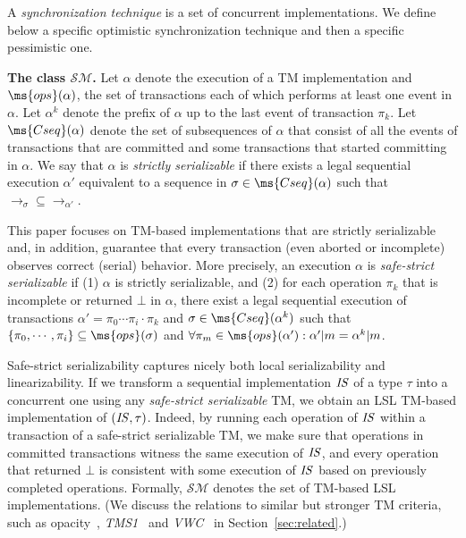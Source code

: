 \documentclass[11pt,pdftex,letterpaper]{article}
\newcommand{\id}[1]{\mbox{\textit{#1}}}\newcommand{\res}[1]{\mbox{\textbf{#1}}}
\begin{document}
A \emph{synchronization technique} is a set of concurrent implementations.
We define below a specific optimistic synchronization technique and then
a specific pessimistic one.


\vspace{1mm}\noindent\textbf{The class $\mathcal{SM}$.}
Let $\alpha$ denote the execution of a TM implementation and
$\ms{ops}(\alpha)$, 
the set of transactions each of which performs at least one event in $\alpha$.
Let ${\alpha}^k$ denote the prefix of $\alpha$ up to the last event of transaction $\pi_k$.
Let $\ms{Cseq}(\alpha)$ denote the set of subsequences of ${\alpha}$  that
consist of all the events of transactions that are committed and some
transactions that started committing in $\alpha$. 
We say that $\alpha$ is \emph{strictly serializable} if 
there exists a legal sequential execution $\alpha'$ equivalent to
a sequence in $\sigma\in\ms{Cseq}(\alpha)$
such that $\rightarrow_{\sigma} \subseteq \rightarrow_{\alpha'}$. 

This paper focuses on TM-based implementations that are strictly
serializable and, in addition, guarantee that every
transaction (even aborted or incomplete) observes correct (serial)
behavior.  
More precisely, an execution $\alpha$ is  \emph{safe-strict serializable} if
(1) $\alpha$ is strictly serializable, and
(2) for each operation $\pi_k$ that is incomplete or returned $\bot$ in
$\alpha$, there exist a legal sequential execution of transactions
$\alpha'=\pi_0\cdots \pi_i\cdot \pi_k$ and
$\sigma\in\ms{Cseq}(\alpha^k)$ such that $\{\pi_0,\cdots, \pi_i\}
\subseteq \ms{ops}(\sigma)$ and $\forall \pi_m\in \ms{ops}(\alpha'):{\alpha'}|m={\alpha^k}|m$.

Safe-strict serializability captures nicely both local serializability
and linearizability. 
If we transform a sequential implementation
$\id{IS}$ of a type $\tau$ into a concurrent one using any
\emph{safe-strict serializable} TM, 
we obtain an LSL TM-based
implementation of $(\id{IS},\tau)$. 
Indeed, by running each operation of $\id{IS}$ within a transaction of
a safe-strict serializable TM, we make sure that operations in 
committed transactions witness the same execution of $\id{IS}$, and
every operation that returned $\bot$ is consistent with some
execution of $\id{IS}$ based on previously completed operations.
Formally, $\mathcal{SM}$ denotes the set of TM-based LSL
implementations.
(We discuss the relations to similar but stronger TM criteria, such as
opacity~\cite{tm-book}, \emph{TMS1}~\cite{TMS09} and
\emph{VWC}~\cite{damien-vw} in Section~\ref{sec:related}.)   
\end{document}
